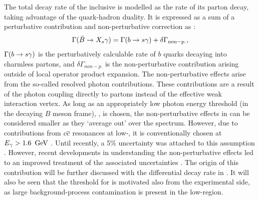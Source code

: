 The total decay rate of the inclusive \BtoXsgamma is modelled as the rate of its parton decay, taking advantage of the quark-hadron duality.
It is expressed as a sum of a perturbative contribution and non-perturbative correction as \cite{Misiak:2015xwa}:
\begin{equation}\label{eq:btosgammarate_nonp}
    \Gamma(\bar{B}\rightarrow X_s\gamma) = \Gamma(b\rightarrow s\gamma) + \delta\Gamma_{\mathrm{non-p.}},
\end{equation}
$\Gamma(b\rightarrow s\gamma)$ is the perturbatively calculable rate of $b$ quarks decaying into charmless partons, and $\delta\Gamma_{non-p.}$ is the non-perturbative contribution arising outside of local operator product expansion.
The non-perturbative effects arise from the so-called resolved photon contributions.
These contributions are a result of the photon coupling directly to partons instead of the effective weak interaction vertex.
As long as an appropriately low photon energy threshold (in the decaying $B$ meson frame), \EB, is chosen, the non-perturbative effects in  can be considered smaller as they `average out' over the spectrum.
However, due to contributions from $c\overline c$ resonances at low-\Egamma, it is conventionally chosen at ${E_{\gamma}}>1.6~\mathrm{\,Ge\kern -0.1em V}$ \cite{Misiak:2009nr}.
Until recently, a 5\% uncertainty was attached to this assumption \cite{Benzke:2010js}. 
However, recent developments in understanding the non-perturbative effects \cite{Gunawardana:2019gep} led to an improved treatment of the associated uncertainties \cite{Misiak:2020vlo}.
The origin of this contribution will be further discussed with the differential decay rate in .
It will also be seen that the threshold for \EB is motivated also from the experimental side, as large background-process contamination is present in the low-\EB region.

